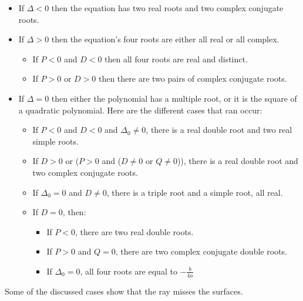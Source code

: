 \documentclass[12pt,a4paper,twoside,openright,BCOR10mm,headsepline,titlepage,abstracton,chapterprefix,final]{scrreprt}
\begin{document}
\begin{itemize}
\item If $\Delta < 0$  then the equation has two real roots and two complex conjugate roots.
\item If $\Delta > 0$  then the equation's four roots are either all real or all complex.
\begin{itemize}
\item If $P < 0$ and $D < 0$ then all four roots are real and distinct.
\item If $P > 0$ or $D > 0$ then there are two pairs of complex conjugate roots.
\end{itemize}
\item If $\Delta = 0$  then either the polynomial has a multiple root, 
  or it is the square of a quadratic polynomial. Here are the different cases that can occur:
  \begin{itemize}
\item If $P < 0$ and $D < 0$ and $\Delta_0\ne0$, there is a real double root and two real simple roots.
\item If $D > 0$ or ($P > 0$ and ($D \ne 0$ or $Q \ne 0$)), there is a real double root and two complex conjugate roots.
\item If $\Delta_0 = 0$ and $D \ne 0$, there is a triple root and a simple root, all real.
\item If $D = 0$, then:
  \begin{itemize}
\item If $P < 0$, there are two real double roots.
\item If $P > 0$ and $Q = 0$, there are two complex conjugate double roots.
\item If $ \Delta_0  = 0$, all four roots are equal to $-\frac{b}{4a}$
  \end{itemize}
  \end{itemize}
\end{itemize}
Some of the discussed cases show that the ray misses the surfaces.
\end{document}
